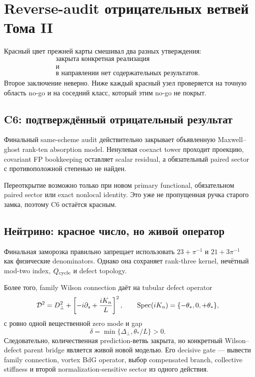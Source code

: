 \chapter{Reverse-audit отрицательных ветвей Тома II}

Красный цвет прежней карты смешивал два разных утверждения:
\begin{equation}
 \begin{gathered}
  \text{закрыта конкретная реализация}\\
  \text{и}\\
  \text{в направлении нет содержательных результатов}.
 \end{gathered}
\end{equation}
Второе заключение неверно. Ниже каждый красный узел проверяется на точную
область no-go и на соседний класс, который этим no-go не покрыт.

\section{C6: подтверждённый отрицательный результат}

Финальный same-scheme audit действительно закрывает объявленную
Maxwell--ghost rank-ten absorption model. Ненулевая coexact tower проходит
проекцию, covariant FP bookkeeping оставляет scalar residual, а обязательный
paired sector с противоположной степенью не найден.

Переоткрытие возможно только при новом primary functional, обязательном
paired sector или exact nonlocal identity. Это уже не пропущенная ручка
старого замка, поэтому C6 остаётся красным.

\section{Нейтрино: красное число, но живой оператор}

Финальная заморозка правильно запрещает использовать
\(23+\pi^{-1}\) и \(21+3\pi^{-1}\) как физические denominators. Однако
она сохраняет rank-three kernel, нечётный mod-two index, \(Q_{\rm cycle}\)
и defect topology.

Более того, family Wilson connection даёт на tubular defect operator
\begin{equation}
 \mathcal D^2=D_\perp^2+
 \left[-i\partial_s+\frac{iK_n}{L}\right]^2,
 \qquad
 \operatorname{Spec}(iK_n)=\{-\theta_*,0,+\theta_*\},
\end{equation}
с ровно одной вещественной zero mode и gap
\begin{equation}
 \delta=\min\{\Delta_\perp,\theta_*/L\}>0.
\end{equation}
Следовательно, количественная prediction-ветвь закрыта, но конкретный
Wilson--defect parent bridge является живой новой моделью. Его decisive gate
--- вывести family connection, vortex BdG operator, выбор compensated branch,
collective stiffness и второй normalization-sensitive sector из одного
действия.

